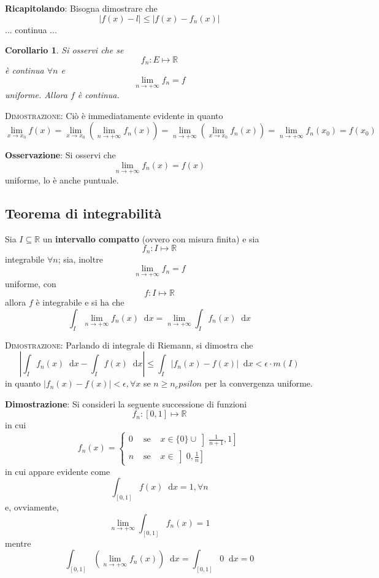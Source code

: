 \documentclass[a4paper]{extarticle}
\newtheorem{corollary}{Corollario}[theorem]
\newcommand*\dif{\mathop{}\!\mathrm{d}}
\begin{document}
\vspace{1em}
\noindent
\textbf{Ricapitolando}: Bisogna dimostrare che
\[\left \vert f(x) - l \right \vert \leq \left \vert f(x) - f_n(x) \right \vert\]
... continua ...

\vspace{1em}
\begin{corollary}
    Si osservi che se
    \[f_n : E \longmapsto \mathbb{R}\]
    è continua $\forall n$ e 
    \[\lim_{n\to +\infty} f_n = f\]
    uniforme. Allora $f$ è continua.
\end{corollary}

\vspace{2em}
\noindent
\normalfont \normalsize
\textsc{Dimostrazione}: Ciò è immediatamente evidente in quanto
\[\lim_{x \to x_0} f(x) = \lim_{x \to x_0} \left(\lim_{n \to +\infty} f_n(x)\right) = \lim_{n \to +\infty} \left(\lim_{x \to x_0} f_n(x)\right) = \lim_{n \to +\infty} f_n(x_0) = f(x_0)\]

\vspace{1em}
\noindent
\textbf{Osservazione}: Si osservi che
\[\lim_{n \to +\infty} f_n(x) = f(x)\]
uniforme, lo è anche puntuale.

\vspace{1em}
\noindent
\subsection{Teorema di integrabilità}
Sia $I \subseteq \mathbb{R}$ un \textbf{intervallo compatto} (ovvero con misura finita) e sia 
\[f_n : I \longmapsto \mathbb{R}\]
integrabile $\forall n$; sia, inoltre
\[\lim_{n \to +\infty} f_n = f\]
uniforme, con
\[f : I \longmapsto \mathbb{R}\]
allora $f$ è integrabile e si ha che
\[\int_I \lim_{n \to +\infty} f_n(x) \dif x = \lim_{n \to +\infty} \int_I f_n(x) \dif x\]

\vspace{2em}
\noindent
\normalfont \normalsize
\textsc{Dimostrazione}: Parlando di integrale di Riemann, si dimostra che
\[\left \vert \int_I f_n(x) \dif x - \int_I f(x) \dif x \right \vert \leq \int_I \left \vert f_n(x) - f(x) \right \vert \dif x < \epsilon \cdot m(I)\]
in quanto $\left \vert f_n(x) - f(x) \right \vert < \epsilon, \forall x$ se $n \geq n_epsilon$ per la convergenza uniforme.

\vspace{1em}
\noindent
\textbf{Dimostrazione}: Si consideri la seguente successione di funzioni
\[f_n : [0,1] \longmapsto \mathbb{R}\]
in cui
\[f_n(x) = \left\{
    \begin{array}{lll}
        0 & \text{ se } & x \in \{0\} \cup \left]\frac{1}{n+1},1\right]\\
        n & \text{ se } & x \in \left]0,\frac{1}{n}\right]
    \end{array}
\right.\]
in cui appare evidente come
\[\int_[0,1] f(x) \dif x = 1, \forall n\]
e, ovviamente,
\[\lim_{n \to +\infty} \int_{[0,1]} f_n(x) = 1\]
mentre
\[\int_{[0,1]} \left(\lim_{n \to +\infty} f_n(x) \right) \dif x = \int_{[0,1]} 0 \dif x = 0\]
\end{document}
